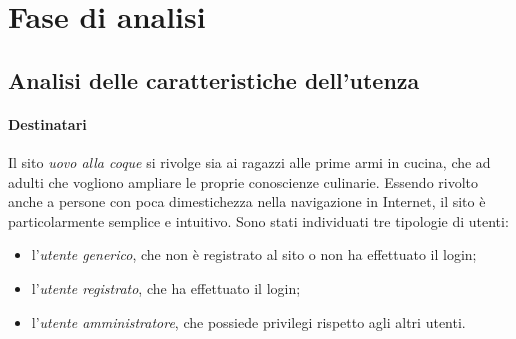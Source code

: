 \section{Fase di analisi}
\subsection{Analisi delle caratteristiche dell'utenza}
\label{sub:analisi_delle_caratteristiche_dell_utenza}
\paragraph{Destinatari}
\label{par:destinatari}
Il sito \emph{uovo alla coque} si rivolge sia ai ragazzi alle prime armi in cucina, che ad adulti che vogliono ampliare le proprie conoscienze culinarie. Essendo rivolto anche a persone con poca dimestichezza nella navigazione in Internet, il sito è particolarmente semplice e intuitivo. Sono stati individuati tre tipologie di utenti:
\begin{itemize}
    \item l'\textit{utente generico}, che non è registrato al sito o non ha effettuato il login;
    \item l'\textit{utente registrato}, che ha effettuato il login;
    \item l'\textit{utente amministratore}, che possiede privilegi rispetto agli altri utenti.
\end{itemize}

